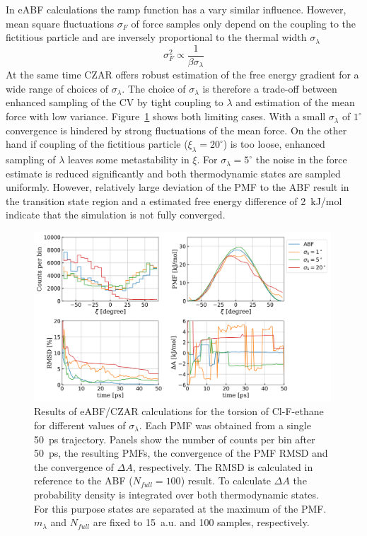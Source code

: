 In eABF calculations the ramp function has a vary similar influence.\autocite{lesage2017smoothed}
However, mean square fluctuations $\sigma_F$ of force samples only depend on the coupling to the fictitious particle and are inversely proportional to the thermal width $\sigma_\lambda$
\begin{equation}
    \sigma_F^2 \propto \frac{1}{\beta\sigma_\lambda}
\end{equation}
At the same time CZAR offers robust estimation of the free energy gradient for a wide range of choices of $\sigma_\lambda$.\autocite{lesage2017smoothed}
The choice of $\sigma_\lambda$ is therefore a trade-off between enhanced sampling of the CV by tight coupling to $\lambda$ and estimation of the mean force with low variance.
Figure~\ref{fig:conf eABF sig} shows both limiting cases.
With a small $\sigma_\lambda$ of $1^\circ$ convergence is hindered by strong fluctuations of the mean force.
On the other hand if coupling of the fictitious particle ($\xi_\lambda=20^\circ$) is too loose, enhanced sampling of $\lambda$ leaves some metastability in $\xi$.
For $\sigma_\lambda=5^\circ$ the noise in the force estimate is reduced significantly and both thermodynamic states are sampled uniformly.
However, relatively large deviation of the PMF to the ABF result in the transition state region and a estimated free energy difference of 2~kJ/mol indicate that the simulation is not fully converged.
\begin{figure}[H]
  \centering
    \includegraphics[width=0.99\textwidth]{bilder/benchmark/eABF_benchmark_sigma}
   \caption{
   Results of eABF/CZAR calculations for the torsion of Cl-F-ethane for different values of $\sigma_{\lambda}$. Each PMF was obtained from a single 50~ps trajectory. Panels show the number of counts per bin after 50~ps, the resulting PMFs, the convergence of the PMF RMSD and the convergence of $\Delta A$, respectively. The RMSD is calculated in reference to the ABF ($N_{full}=100$) result. To calculate $\Delta A$ the probability density is integrated over both thermodynamic states. For this purpose states are separated at the maximum of the PMF. $m_\lambda$ and $N_{full}$ are fixed to 15~a.u. and 100 samples, respectively.
   }
   \label{fig:conf eABF sig}
\end{figure}
